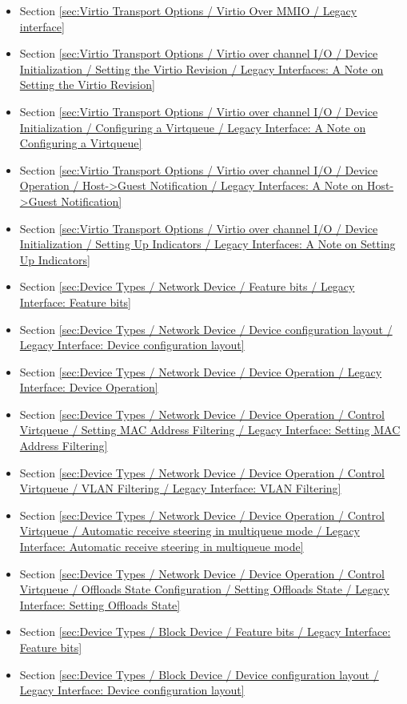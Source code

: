 \begin{itemize}
\item Section \ref{sec:Virtio Transport Options / Virtio Over MMIO / Legacy interface}
\item Section \ref{sec:Virtio Transport Options / Virtio over channel I/O / Device Initialization / Setting the Virtio Revision / Legacy Interfaces: A Note on Setting the Virtio Revision}
\item Section \ref{sec:Virtio Transport Options / Virtio over channel I/O / Device Initialization / Configuring a Virtqueue / Legacy Interface: A Note on Configuring a Virtqueue}
\item Section \ref{sec:Virtio Transport Options / Virtio over channel I/O / Device Operation / Host->Guest Notification / Legacy Interfaces: A Note on Host->Guest Notification}
\item Section \ref{sec:Virtio Transport Options / Virtio over channel I/O / Device Initialization / Setting Up Indicators / Legacy Interfaces: A Note on Setting Up Indicators}
\item Section \ref{sec:Device Types / Network Device / Feature bits / Legacy Interface: Feature bits}
\item Section \ref{sec:Device Types / Network Device / Device configuration layout / Legacy Interface: Device configuration layout}
\item Section \ref{sec:Device Types / Network Device / Device Operation / Legacy Interface: Device Operation}
\item Section \ref{sec:Device Types / Network Device / Device Operation / Control Virtqueue / Setting MAC Address Filtering / Legacy Interface: Setting MAC Address Filtering}
\item Section \ref{sec:Device Types / Network Device / Device Operation / Control Virtqueue / VLAN Filtering / Legacy Interface: VLAN Filtering}
\item Section \ref{sec:Device Types / Network Device / Device Operation / Control Virtqueue / Automatic receive steering in multiqueue mode / Legacy Interface: Automatic receive steering in multiqueue mode}
\item Section \ref{sec:Device Types / Network Device / Device Operation / Control Virtqueue / Offloads State Configuration / Setting Offloads State / Legacy Interface: Setting Offloads State}
\item Section \ref{sec:Device Types / Block Device / Feature bits / Legacy Interface: Feature bits}
\item Section \ref{sec:Device Types / Block Device / Device configuration layout / Legacy Interface: Device configuration layout}

\end{itemize}
